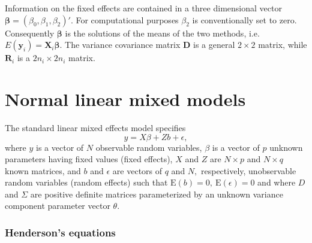 \documentclass[12pt, a4paper]{report}
\theoremstyle{plain}
\theoremstyle{definition}
\theoremstyle{remark}
\begin{document}
Information on the fixed effects are contained in a three dimensional vector $\boldsymbol{\beta} = (\beta_{0},\beta_{1},\beta_{2})\prime$. For computational purposes $\beta_{2}$ is conventionally set to zero. Consequently $\boldsymbol{\beta}$ is the solutions of the means of the two methods, i.e. $E(\boldsymbol{y}_{i})  = \boldsymbol{X}_{i}\boldsymbol{\beta}$. The variance covariance matrix $\boldsymbol{D}$ is a general $2 \times 2$ matrix, while $\boldsymbol{R}_{i}$ is a $2n_{i} \times 2n_{i}$ matrix.


\section{Normal linear mixed models}

The standard linear mixed effects model specifies
\begin{equation}
y = X \beta + Zb + \epsilon , 
\label{lme:Model}
\end{equation}
where $y$ is a vector of $N$ observable random variables, $\beta$ is a vector of $p$ unknown parameters having fixed values (fixed effects), $X$ and $Z$ are $N \times p$ and $N \times q$ known matrices, and $b$ and $\epsilon$  are vectors of $q$ and $N,$ respectively, unobservable random variables (random effects) such that $\mathrm{E}(b)=0, \ \mathrm{E}(\epsilon)=0$
and
where $D$ and $\Sigma$ are positive definite matrices parameterized by an unknown variance component parameter vector $ \theta.$


\subsubsection*{Henderson's equations}
\end{document}
